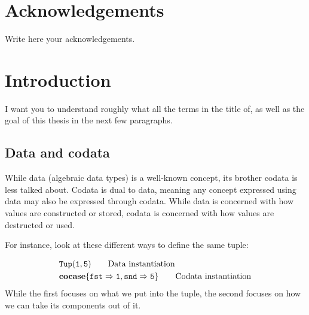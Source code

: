 \documentclass[twoside,12pt,a4paper]{article}
\begin{document}
\section*{Acknowledgements}

Write here your acknowledgements.

\cleardoublepage


\renewcommand{\baselinestretch}{1.3}
\small\normalsize

\tableofcontents

\renewcommand{\baselinestretch}{1}
\small\normalsize

\listoftheorems

\cleardoublepage


\setcounter{page}{1}

\section{Introduction}

I want you to understand roughly what all the terms in the title of,
as well as the goal of this thesis in the next few paragraphs. 

\subsection{Data and codata}
While data (algebraic data types) is a well-known concept, 
its brother codata is less talked about. Codata is dual to data, meaning any concept expressed using data may also be expressed through codata. 
While data is concerned with how values are constructed or stored, codata is concerned with how values are destructed or used. 

For instance, look at these different ways to define the same tuple: 

\begin{example}
    \begin{align*}
        &\mathtt{Tup(}\mathtt{1,5}\mathtt{)} \tag*{Data instantiation}\\
        &\textbf{cocase}\{\mathtt{fst \Rightarrow 1}, \mathtt{snd \Rightarrow 5}\} \tag*{Codata instantiation}
    \end{align*}     
    While the first focuses on what we put into the tuple, the second focuses on how we can take its components out of it.   
\end{example}
\end{document}
